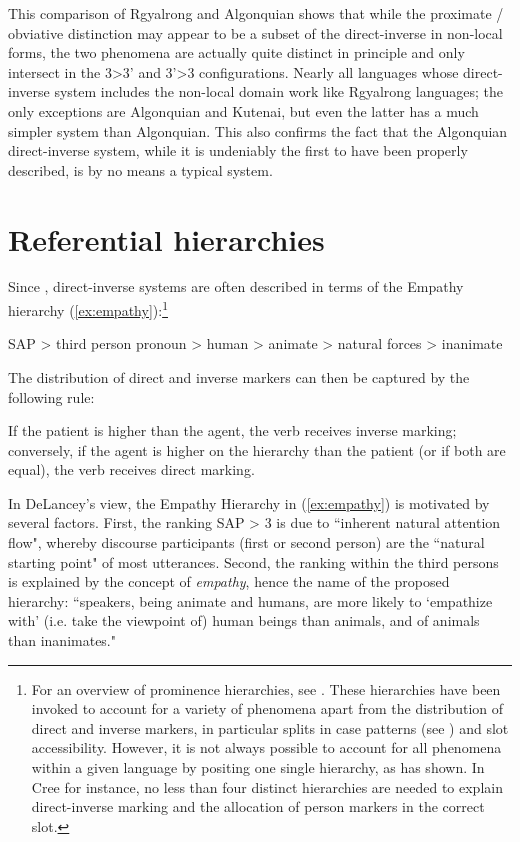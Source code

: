 \documentclass[twoside,a4paper,11pt]{article}
\begin{document}
This comparison of Rgyalrong and Algonquian shows that while the proximate / obviative distinction may appear to be a subset of the direct-inverse in non-local forms, the two phenomena are actually quite distinct in principle and only intersect in the 3>3' and 3'>3 configurations. Nearly all languages whose direct-inverse system includes the non-local domain work like Rgyalrong languages; the only exceptions are Algonquian and Kutenai, but even the latter has a much simpler system than Algonquian. This also confirms the fact that the Algonquian direct-inverse system, while it is undeniably the first to have been properly described, is by no means a typical system.




\section{Referential hierarchies} \label{sec:hierarchies}


Since \citet[644]{delancey81ergativity},  direct-inverse systems are often described in terms of the Empathy hierarchy (\ref{ex:empathy}):\footnote{For an overview of prominence hierarchies, see \citet{lockwood12hierarchies}. These hierarchies have been invoked to account for a variety of phenomena apart from the distribution of direct and inverse markers, in particular splits in case patterns (see \citealt{silverstein76}) and slot accessibility. However, it is not always possible to account for all phenomena within a given language by positing one single hierarchy, as \citealt{zuniga06} has shown. In Cree for instance, no less than four distinct hierarchies are needed to explain direct-inverse marking and the allocation of person markers in the correct slot.}

\begin{exe}
\ex \label{ex:empathy}
\glt SAP > third person pronoun > human > animate > natural forces > inanimate
\end{exe}



The distribution of direct and inverse markers  can then be  captured by the following rule: 
\begin{exe}
\ex \label{ex:direct-inverse-rule}
\glt  If the patient is higher than the agent, the verb receives inverse marking; conversely, if the agent is higher on the hierarchy than the patient (or if both are equal), the verb receives direct marking.
\end{exe}
In DeLancey's view, the Empathy Hierarchy in (\ref{ex:empathy}) is motivated by several factors. First, the ranking SAP > 3 is due to ``inherent natural attention flow", whereby discourse participants (first or second person) are the ``natural starting point" of most utterances. Second, the ranking within the third persons is explained by the concept of \textit{empathy}, hence the name of the proposed hierarchy: ``speakers, being animate and humans, are more likely to `empathize with' (i.e. take the viewpoint of) human beings than animals, and of animals than inanimates."
\end{document}

